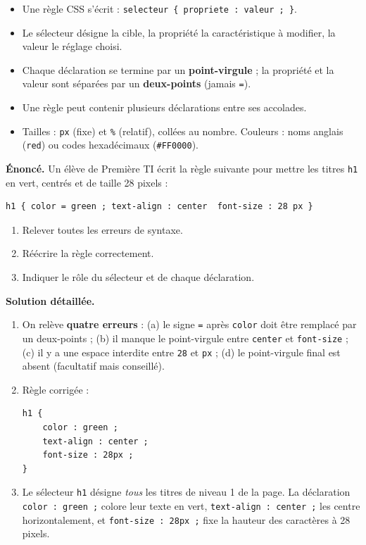 \documentclass[11pt]{article}
\newcommand{\cle}[1]{{\popxbold\color{popdark}#1}}
\begin{document}
\begin{aretenir}
\begin{itemize}
  \item Une règle CSS s'écrit : \texttt{selecteur \{ propriete : valeur ; \}}.
  \item Le \cle{sélecteur} désigne la cible, la \cle{propriété} la caractéristique à modifier, la \cle{valeur} le réglage choisi.
  \item Chaque déclaration se termine par un \textbf{point-virgule} ; la propriété et la valeur sont séparées par un \textbf{deux-points} (jamais \texttt{=}).
  \item Une règle peut contenir plusieurs déclarations entre ses accolades.
  \item Tailles : \texttt{px} (fixe) et \texttt{\%} (relatif), collées au nombre. Couleurs : noms anglais (\texttt{red}) ou codes hexadécimaux (\texttt{\#FF0000}).
\end{itemize}
\end{aretenir}

\begin{exoresolu}
\textbf{Énoncé.} Un élève de Première TI écrit la règle suivante pour mettre les titres \texttt{h1} en vert, centrés et de taille 28 pixels :
\begin{lstlisting}
h1 { color = green ; text-align : center  font-size : 28 px }
\end{lstlisting}
\begin{enumerate}
  \item Relever toutes les erreurs de syntaxe.
  \item Réécrire la règle correctement.
  \item Indiquer le rôle du sélecteur et de chaque déclaration.
\end{enumerate}
\tcblower
\textbf{Solution détaillée.}
\begin{enumerate}
  \item On relève \textbf{quatre erreurs} : (a) le signe \texttt{=} après \texttt{color} doit être remplacé par un deux-points ; (b) il manque le point-virgule entre \texttt{center} et \texttt{font-size} ; (c) il y a une espace interdite entre \texttt{28} et \texttt{px} ; (d) le point-virgule final est absent (facultatif mais conseillé).
  \item Règle corrigée :
\begin{lstlisting}
h1 {
    color : green ;
    text-align : center ;
    font-size : 28px ;
}
\end{lstlisting}
  \item Le sélecteur \texttt{h1} désigne \emph{tous} les titres de niveau 1 de la page. La déclaration \texttt{color : green ;} colore leur texte en vert, \texttt{text-align : center ;} les centre horizontalement, et \texttt{font-size : 28px ;} fixe la hauteur des caractères à 28 pixels.
\end{enumerate}
\end{exoresolu}
\end{document}
